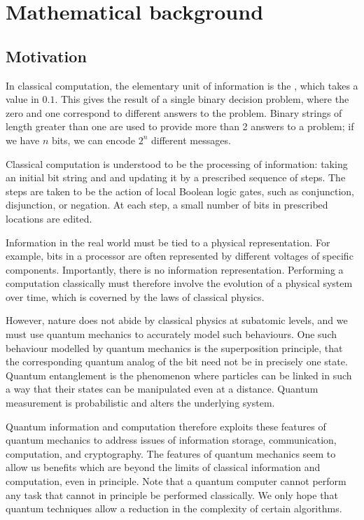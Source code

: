 \section{Mathematical background}

\subsection{Motivation}
In classical computation, the elementary unit of information is the , which takes a value in $\qty{0,1}$.
This gives the result of a single binary decision problem, where the zero and one correspond to different answers to the problem.
Binary strings of length greater than one are used to provide more than 2 answers to a problem; if we have $n$ bits, we can encode $2^n$ different messages.

Classical computation is understood to be the processing of information: taking an initial bit string and and updating it by a prescribed sequence of steps.
The steps are taken to be the action of local Boolean logic gates, such as conjunction, disjunction, or negation.
At each step, a small number of bits in prescribed locations are edited.

Information in the real world must be tied to a physical representation.
For example, bits in a processor are often represented by different voltages of specific components.
Importantly, there is no information  representation.
Performing a computation classically must therefore involve the evolution of a physical system over time, which is coverned by the laws of classical physics.

However, nature does not abide by classical physics at subatomic levels, and we must use quantum mechanics to accurately model such behaviours.
One such behaviour modelled by quantum mechanics is the superposition principle, that the corresponding quantum analog of the bit need not be in precisely one state.
Quantum entanglement is the phenomenon where particles can be linked in such a way that their states can be manipulated even at a distance.
Quantum measurement is probabilistic and alters the underlying system.

Quantum information and computation therefore exploits these features of quantum mechanics to address issues of information storage, communication, computation, and cryptography.
The features of quantum mechanics seem to allow us benefits which are beyond the limits of classical information and computation, even in principle.
Note that a quantum computer cannot perform any task that cannot in principle be performed classically.
We only hope that quantum techniques allow a reduction in the complexity of certain algorithms.

